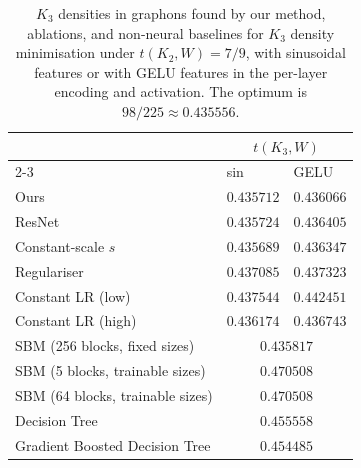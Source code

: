 \documentclass{article}
\theoremstyle{plain}
\theoremstyle{definition}
\theoremstyle{remark}
\begin{document}
\begin{table}[t]
  \centering
  \caption{$K_3$ densities in graphons found by our method, ablations, and non-neural baselines for $K_3$ density minimisation under $t(K_2, W)=7/9$, with sinusoidal features or with GELU features in the per-layer encoding and activation. The optimum is $98/225 \approx 0.435556$.  \label{tab:ablationstudy}}
  {\small
  \begin{tabular}{lll}
  \toprule
                     & \multicolumn{2}{c}{$t(K_3, W)$} \\
  \cmidrule(lr){2-3}
                     & sin & GELU \\
  \midrule
  Ours                                     & $0.435712$ & $0.436066$ \\
  ResNet                                   & $0.435724$ & $0.436405$ \\
  Constant-scale $s$                       & $0.435689$ & $0.436347$ \\
  Regulariser                              & $0.437085$ & $0.437323$ \\
  Constant LR (low)                        & $0.437544$ & $0.442451$ \\
  Constant LR (high)                       & $0.436174$ & $0.436743$ \\
  \midrule
  SBM (256 blocks, fixed sizes)            & \multicolumn{2}{c}{$0.435817$} \\
  SBM (5 blocks, trainable sizes)          & \multicolumn{2}{c}{$0.470508$} \\
  SBM (64 blocks, trainable sizes)         & \multicolumn{2}{c}{$0.470508$} \\
  Decision Tree                            & \multicolumn{2}{c}{$0.455558$} \\
  Gradient Boosted Decision Tree           & \multicolumn{2}{c}{$0.454485$} \\
  \bottomrule
  \end{tabular}
  }
\end{table}
\end{document}
